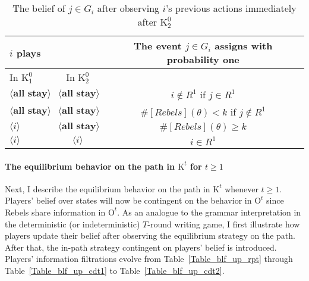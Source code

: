 \documentclass[12pt,letter]{article}
\newcommand{\Kappa}{\mathrm{K}}
\newcommand{\Omicron}{\mathrm{O}}
\theoremstyle{definition}
\theoremstyle{remark}
\theoremstyle{claim}
\begin{document}
\begin{table}[!htbp]
\caption{The belief of $j\in G_i$ after observing $i$'s previous actions immediately after $\Kappa^0_{2}$}
\label{Table_blf_up_cd02}
\begin{center}
\begin{tabular}{l  c | c}
 	$i$ plays	  	&  	  &The event $j\in G_i$ assigns with probability one \\
\hline
\hline
	In $\Kappa^0_{1}$		&			In $\Kappa^0_{2}$	&  \\
\hline
  $\langle \textbf{all stay} \rangle$	&  $\langle \textbf{all stay} \rangle$ &  $i\notin R^1$ if $j\in R^1$ \\
  $\langle \textbf{all stay} \rangle$	&  $\langle \textbf{all stay} \rangle$ &  $\#[Rebels](\theta)< k$ if $j\notin R^1$\\
  $\langle i \rangle$	&	$\langle \textbf{all stay} \rangle$ &  $\#[Rebels](\theta)\geq k$    \\
  $\langle i \rangle$	&	$\langle i \rangle$ &  $i\in R^1$  \\
  \hline
\end{tabular}
\end{center}
\end{table}

\clearpage

\paragraph{The equilibrium behavior on the path in $\Kappa^t$ for $t\geq 1$}
Next, I describe the equilibrium behavior on the path in $\Kappa^t$ whenever $t\geq 1$. Players' belief over states will now be contingent on the behavior in $\Omicron^t$ since Rebels share information in $\Omicron^t$. As an analogue to the grammar interpretation in the deterministic (or indeterministic) $T$-round writing game, I first illustrate how players update their belief after observing the equilibrium strategy on the path. After that, the in-path strategy contingent on players' belief is introduced. Players' information filtrations evolve from Table~\ref{Table_blf_up_rpt} through Table~\ref{Table_blf_up_cdt1} to Table~\ref{Table_blf_up_cdt2}.
\end{document}
